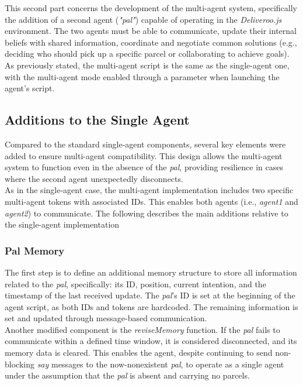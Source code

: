     This second part concerns the development of the multi-agent system, specifically the addition of a second agent (\textit{"pal"}) capable of operating in the \textit{Deliveroo.js} environment. The two agents must be able to communicate, update their internal beliefs with shared information, coordinate and negotiate common solutions (e.g., deciding who should pick up a specific parcel or collaborating to achieve goals).
    \medskip\\ 
    As previously stated, the multi-agent script is the same as the single-agent one, with the multi-agent mode enabled through a parameter when launching the agent's script.

    \subsection{Additions to the Single Agent}
        Compared to the standard single-agent components, several key elements were added to ensure multi-agent compatibility. This design allows the multi-agent system to function even in the absence of the \textit{pal}, providing resilience in cases where the second agent unexpectedly disconnects.
        \medskip\\
        As in the single-agent case, the multi-agent implementation includes two specific multi-agent tokens with associated IDs. This enables both agents (i.e., \textit{agent1} and \textit{agent2}) to communicate. The following describes the main additions relative to the single-agent implementation


        \subsubsection{Pal Memory}
            The first step is to define an additional memory structure to store all information related to the \textit{pal}, specifically: its ID, position, current intention, and the timestamp of the last received update. The \textit{pal}'s ID is set at the beginning of the agent script, as both IDs and tokens are hardcoded. The remaining information is set and updated through message-based communication.
            \medskip\\
            Another modified component is the \textit{reviseMemory} function. If the \textit{pal} fails to communicate within a defined time window, it is considered disconnected, and its memory data is cleared. This enables the agent, despite continuing to send non-blocking \textit{say} messages to the now-nonexistent \textit{pal}, to operate as a single agent under the assumption that the \textit{pal} is absent and carrying no parcels.

